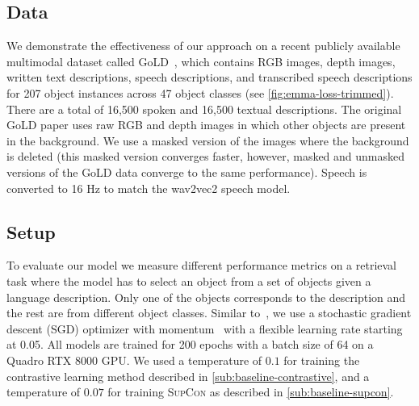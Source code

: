 \documentclass[10pt]{article} %
\newcommand{\supcon}{\textsc{SupCon}}
\begin{document}
\subsection{Data}
\label{sec:Data}

We demonstrate the effectiveness of our approach on a recent publicly available multimodal dataset called GoLD~\citep{GoLD_UMBC}, which contains RGB images, depth images, written text descriptions, speech descriptions, and transcribed speech descriptions for 207 object instances across 47 object classes (see \cref{fig:emma-loss-trimmed}). There are a total of 16,500 spoken and 16,500 textual descriptions. The original GoLD paper uses raw RGB and depth images in which other objects are present in the background. We use a masked version of the images where the background is deleted (this masked version converges faster, however, masked and unmasked versions of the GoLD data converge to the same performance). Speech is converted to 16 Hz to match the wav2vec2 speech model.


\subsection{Setup}
\label{sec:setup}
To evaluate our model we measure different performance metrics on a retrieval task where the model has to select an object from a set of objects given a language description. Only one of the objects corresponds to the description and the rest are from different object classes.
% 
Similar to~\citet{NEURIPS2020_supervised_contrastive}, we use a stochastic gradient descent (SGD) optimizer with momentum~\citep{ruder2016overviewSGD} with a flexible learning rate starting at 0.05. 
All models are trained for 200 epochs with a batch size of 64 on a Quadro RTX 8000 GPU. We used a temperature of $0.1$ for training the contrastive learning method described in \cref{sub:baseline-contrastive}, and a temperature of $0.07$ for training \supcon{} as described in \cref{sub:baseline-supcon}.
\end{document}
